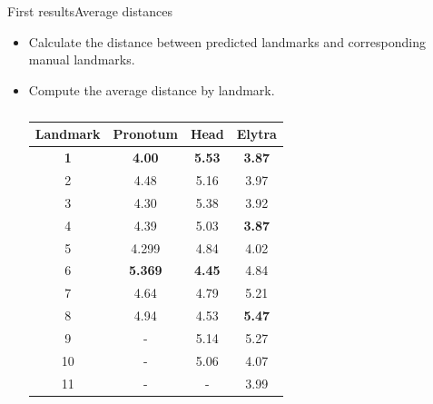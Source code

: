 \documentclass[10pt,svgnames]{beamer}
\begin{document}

\begin{frame}{First results}{Average distances}
	\begin{itemize}			
		\item Calculate the distance between predicted landmarks and corresponding manual landmarks.	
		\item Compute the average distance by landmark.\\
		
			\begin{table}[htbp]
				\centering
				\begin{tabular}{|c|c|c|c|}
					\hline
					\textbf{Landmark} & \textbf{Pronotum} & \textbf{Head} & \textbf{Elytra} \\ \hline
					\textbf{\color{green}1} & \textbf{\color{green}4.00} & \textbf{\color{red}5.53} & \textbf{\color{green}3.87}   \\ \hline
					2 & 4.48 & 5.16 & 3.97  \\ \hline
					3 & 4.30 & 5.38 & 3.92 \\ \hline
					4 & 4.39 & 5.03 & \textbf{\color{green}3.87} \\ \hline
					5 & 4.299 & 4.84 & 4.02 \\ \hline
					6 & \textbf{\color{red}5.369} & \textbf{\color{green}4.45} & 4.84 \\ \hline
					7 & 4.64 & 4.79 & 5.21  \\ \hline
					8 & 4.94 & 4.53 & \textbf{\color{red}5.47} \\ \hline
					9 & - & 5.14 & 5.27 \\ \hline
					10 & - & 5.06 & 4.07 \\ \hline
					11 & - & - & 3.99 \\ \hline
				\end{tabular}
				\caption*{}
			\end{table}
	\end{itemize}
\end{frame}

\end{document}

